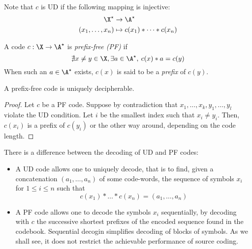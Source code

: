 \documentclass[toc]{../cs-classes/cs-classes}
\begin{document}
\begin{remark}
    Note that $c$ is UD if the following mapping is injective:
    \begin{equation*}
        \begin{aligned}
            \X^\star&\to\A^\star\\
            (x_1, \dots, x_n)&\mapsto c(x_1) * \dots * c(x_n)
        \end{aligned}
    \end{equation*}
\end{remark}

\begin{definition}
    A code $c: \X\to\A^\star$ is \emph{prefix-free (PF)} if
    \begin{equation*}
        \nexists x\neq y\in \X, \exists a\in\A^\star,\: c(x)*a=c(y)
    \end{equation*} 
    When such an $a\in\A^\star$ exists, $c(x)$ is said to be a \emph{prefix} of $c(y)$.
\end{definition}

\begin{lemma}[PF$\implies$ UD]
    A prefix-free code is uniquely decipherable.
\end{lemma}

\begin{proof}
    Let $c$ be a PF code. Suppose by contradiction that $x_1, \dots, x_k, y_1, \dots, y_l$ violate the UD condition. Let $i$ be the smallest index such that $x_i\neq y_i$. Then, $c(x_i)$ is a prefix of $c(y_i)$ or the other way around, depending on the code length.
\end{proof}

\begin{remark}
    There is a difference between the decoding of UD and PF codes:
    \begin{itemize}
        \item A UD code allows one to uniquely decode, that is to find, given a concatenation $(a_1, \dots, a_n)$ of some code-words, the sequence of symbols $x_i$ for $1\leq i\leq n$ such that
        \begin{equation*}
            c(x_1)*\dots *c(x_n)=(a_1, \dots, a_n)
        \end{equation*} 
        \item A PF code allows one to decode the symbols $x_i$ sequentially, by decoding with $c$ the successive shortest prefixes of the encoded sequence found in the codebook. Sequential decogin simplifies decoding of blocks of symbols. As we shall see, it does not restrict the achievable performance of source coding.
    \end{itemize}
\end{remark}
\end{document}
